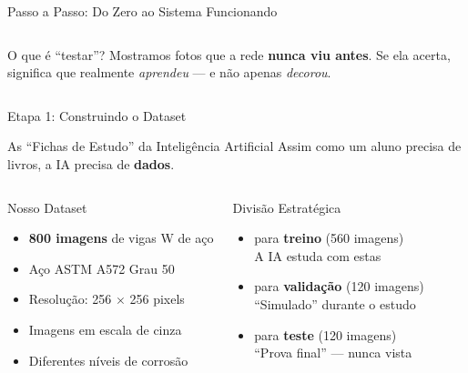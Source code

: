 \documentclass[aspectratio=169, 12pt]{beamer}
\begin{document}
\begin{frame}{Passo a Passo: Do Zero ao Sistema Funcionando}
\begin{columns}[T]
        \begin{block}{O que é ``testar''?}
            Mostramos fotos que a rede \textbf{nunca viu antes}. Se ela acerta, significa que realmente \textit{aprendeu} --- e não apenas \textit{decorou}.
        \end{block}
    \end{columns}
\end{frame}

\begin{frame}{Etapa 1: Construindo o Dataset}
    \begin{block}{As ``Fichas de Estudo'' da Inteligência Artificial}
        Assim como um aluno precisa de livros, a IA precisa de \textbf{dados}.
    \end{block}

    \vspace{0.3cm}

    \begin{columns}[T]
        \begin{block}{Nosso Dataset}
            \begin{itemize}
                \item \textbf{800 imagens} de vigas W de aço
                \item Aço ASTM A572 Grau 50
                \item Resolução: 256 $\times$ 256 pixels
                \item Imagens em escala de cinza
                \item Diferentes níveis de corrosão
            \end{itemize}
        \end{block}

        \begin{block}{Divisão Estratégica}
            \begin{itemize}
                \item[\textcolor{uerjazul}{\textbf{70\%}}] para \textbf{treino} (560 imagens)\\
                    {\scriptsize A IA estuda com estas}
                \item[\textcolor{laranjaalerta}{\textbf{15\%}}] para \textbf{validação} (120 imagens)\\
                    {\scriptsize ``Simulado'' durante o estudo}
                \item[\textcolor{verdepositivo}{\textbf{15\%}}] para \textbf{teste} (120 imagens)\\
                    {\scriptsize ``Prova final'' --- nunca vista}
            \end{itemize}
        \end{block}
    \end{columns}


\end{frame}
\end{document}
